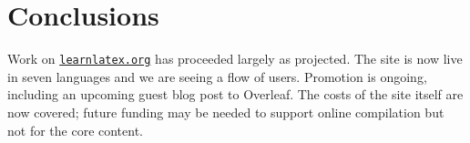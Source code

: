 \documentclass[a4paper]{article}
\begin{document}
\section{Conclusions}

Work on  \href{https://learnlatex.org}{\nolinkurl{learnlatex.org}} has proceeded largely as projected. The site is
now live in seven languages and we are seeing a flow of users. Promotion is
ongoing, including an upcoming guest blog post to Overleaf. The costs of the
site itself are now covered; future funding may be needed to support online
compilation but not for the core content.
\end{document}
